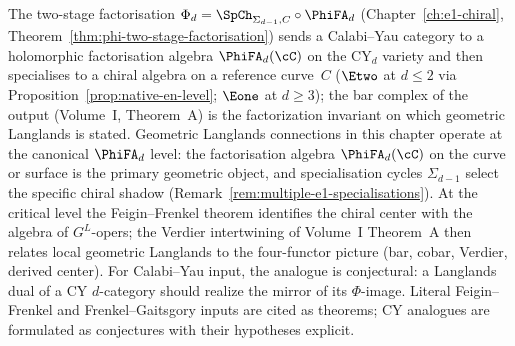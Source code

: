 The two-stage factorisation $\Phi_d = \SpCh_{\Sigma_{d-1}, C} \circ \PhiFA_d$ (Chapter~\ref{ch:e1-chiral}, Theorem~\ref{thm:phi-two-stage-factorisation}) sends a Calabi--Yau category to a holomorphic factorisation algebra $\PhiFA_d(\cC)$ on the CY$_d$ variety and then specialises to a chiral algebra on a reference curve~$C$ ($\Etwo$ at $d \leq 2$ via Proposition~\ref{prop:native-en-level}; $\Eone$ at $d \geq 3$); the bar complex of the output (Volume~I, Theorem~A) is the factorization invariant on which geometric Langlands is stated. Geometric Langlands connections in this chapter operate at the canonical $\PhiFA_d$ level: the factorisation algebra $\PhiFA_d(\cC)$ on the curve or surface is the primary geometric object, and specialisation cycles $\Sigma_{d-1}$ select the specific chiral shadow (Remark~\ref{rem:multiple-e1-specialisations}). At the critical level the Feigin--Frenkel theorem identifies the chiral center with the algebra of $G^L$-opers; the Verdier intertwining of Volume~I Theorem~A then relates local geometric Langlands to the four-functor picture (bar, cobar, Verdier, derived center). For Calabi--Yau input, the analogue is conjectural: a Langlands dual of a CY $d$-category should realize the mirror of its $\Phi$-image. Literal Feigin--Frenkel and Frenkel--Gaitsgory inputs are cited as theorems; CY analogues are formulated as conjectures with their hypotheses explicit.

